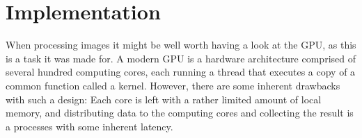 \documentclass[10pt,a4paper]{article}
\newcommand\sumb[2]{\sum\limits_{#1}^{#2}\,}
\newcommand\1{\vec 1}
\begin{document}

   

\newpage
\section{Implementation}

When processing images it might be well worth having a look at the \gls{GPU}, as this is a task it was made for. A modern \gls{GPU} is a hardware architecture comprised of several hundred computing cores, each running a thread that executes a copy of a common function called a kernel. However, there are some inherent drawbacks with such a design: Each core is left with a rather limited amount of local memory, and distributing data to the computing cores and collecting the result is a processes with some inherent latency.
\end{document}
